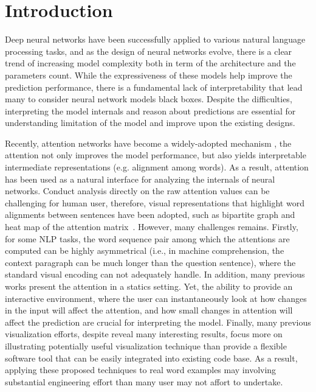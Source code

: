 \section{Introduction}

Deep neural networks have been successfully applied to various natural language processing tasks,
and as the design of neural networks evolve, there is a clear trend of increasing model complexity both in term of the architecture and the parameters count. 
%
While the expressiveness of these models help improve the prediction performance, there is a fundamental lack of interpretability that lead many to consider neural network models black boxes. 
%
Despite the difficulties, interpreting the model internals and reason about predictions are essential for understanding limitation of the model and improve upon the existing designs.


Recently, attention networks have become a widely-adopted mechanism \cite{VaswaniShazeerParmar2017, Parikh2016}, the attention not only improves the model performance, but also yields interpretable intermediate representations (e.g. alignment among words). As a result, attention has been used as a natural interface for analyzing the internals of neural networks. Conduct analysis directly on the raw attention values can be challenging for human user, therefore, visual representations that highlight word alignments between sentences have been adopted, such as bipartite graph and heat map of the attention matrix~\cite{LiChenHovy2015, li2016understanding, lee2017interactive}.  However, many challenges remains. Firstly, for some NLP tasks, the word sequence pair among which the attentions are computed can be highly asymmetrical (i.e., in machine comprehension, the context paragraph can be much longer than the question sentence), where the standard visual encoding can not adequately handle.  In addition, many previous works present the attention in a statics setting. Yet, the ability to provide an interactive environment, where the user can instantaneously look at how changes in the input will affect the attention, and how small changes in attention will affect the prediction are crucial for interpreting the model. Finally, many previous visualization efforts, despite reveal many interesting results, focus more on illustrating potentially useful visualization technique than provide a flexible software tool that can be easily integrated into existing code base. As a result, applying these proposed techniques to real word examples may involving substantial engineering effort than many user may not affort to undertake.

